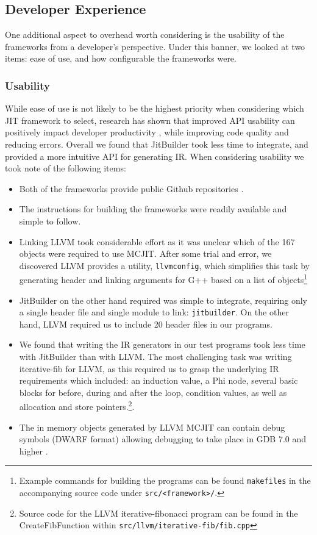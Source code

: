 \subsection{Developer Experience}
One additional aspect to overhead worth considering is the usability of the frameworks from a developer's perspective.
Under this banner, we looked at two items: ease of use, and how configurable the frameworks were.

\subsubsection{Usability}
While ease of use is not likely to be the highest priority when considering which JIT framework to select, research has shown that improved API usability can positively impact developer productivity \cite{apiUsability}, while improving code quality and reducing errors.
Overall we found that JitBuilder took less time to integrate, and provided a more intuitive API for generating IR.
When considering usability we took note of the following items:
\begin{itemize}
  \item Both of the frameworks provide public Github repositories \cite{llvmGithub,jitbuilderGithub}.
  \item The instructions for building the frameworks were readily available and simple to follow.
  \item Linking LLVM took considerable effort as it was unclear which of the 167 objects were required to use MCJIT. After some trial and error, we discovered LLVM provides a utility, \texttt{llvmconfig}, which simplifies this task by generating header and linking arguments for G++ based on a list of objects\footnote{Example commands for building the programs can be found \texttt{makefiles} in the accompanying source code \cite{projectGithub} under \texttt{src/<framework>/}.} 
  \item JitBuilder on the other hand required was simple to integrate, requiring only a single header file and single module to link: \texttt{jitbuilder}. On the other hand, LLVM required us to include 20 header files in our programs.
  \item We found that writing the IR generators in our test programs took less time with JitBuilder than with LLVM. 
  The most challenging task was writing iterative-fib for LLVM, as this required us to grasp the underlying IR requirements which included: an induction value, a Phi node, several basic blocks for before, during and after the loop, condition values, as well as allocation and store pointers.\footnote{Source code for the LLVM iterative-fibonacci program can be found in the CreateFibFunction within \texttt{src/llvm/iterative-fib/fib.cpp}}.
  \item The in memory objects generated by LLVM MCJIT can contain debug symbols (DWARF format) allowing debugging to take place in GDB 7.0 and higher \cite{llvmDebugJIT}.
\end{itemize}


